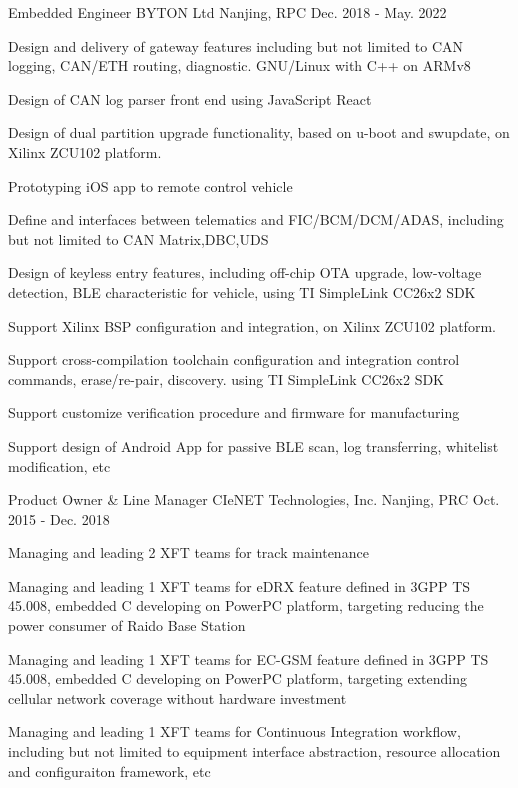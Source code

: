 \begin{cventries}
  \cventry
    {Embedded Engineer} %
    {BYTON Ltd} %
    {Nanjing, RPC} %
    {Dec. 2018 - May. 2022} %
    {
      \begin{cvitems} %
        \item {Design and delivery of gateway features including but not limited to CAN logging, CAN/ETH routing, diagnostic. GNU/Linux with C++ on ARMv8}
        \item {Design of CAN log parser front end using JavaScript React}
        \item {Design of dual partition upgrade functionality, based on u-boot and swupdate, on Xilinx ZCU102 platform.}
        \item {Prototyping iOS app to remote control vehicle}
        \item {Define and interfaces between telematics and FIC/BCM/DCM/ADAS, including but not limited to CAN Matrix,DBC,UDS}
        \item {Design of keyless entry features, including off-chip OTA upgrade, low-voltage detection, BLE characteristic for vehicle, using TI SimpleLink CC26x2 SDK}
        \item {Support Xilinx BSP configuration and integration, on Xilinx ZCU102 platform.}
        \item {Support cross-compilation toolchain configuration and integration control commands, erase/re-pair, discovery. using TI SimpleLink CC26x2 SDK}
        \item {Support customize verification procedure and firmware for manufacturing}
        \item {Support design of Android App for passive BLE scan, log transferring, whitelist modification, etc}
      \end{cvitems}
    }

  \cventry
    {Product Owner \& Line Manager} %
    {CIeNET Technologies, Inc.} %
    {Nanjing, PRC} %
    {Oct. 2015 - Dec. 2018} %
    {
      \begin{cvitems} %
        \item {Managing and leading 2 XFT teams for track maintenance}
        \item {Managing and leading 1 XFT teams for eDRX feature defined in 3GPP TS 45.008, embedded C developing on PowerPC platform, targeting reducing the power consumer of Raido Base Station}
        \item {Managing and leading 1 XFT teams for EC-GSM feature defined in 3GPP TS 45.008, embedded C developing on PowerPC platform, targeting extending cellular network coverage without hardware investment}
        \item {Managing and leading 1 XFT teams for Continuous Integration workflow, including but not limited to equipment interface abstraction, resource allocation and configuraiton framework, etc}
      \end{cvitems}
    }


\end{cventries}
